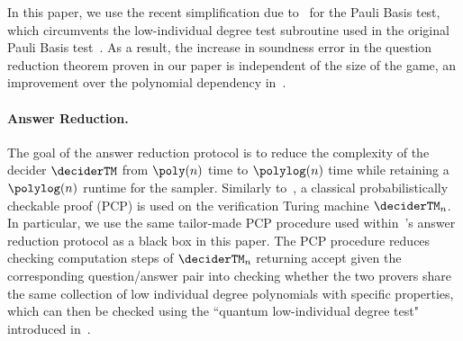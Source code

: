 In this paper, we use the recent simplification due to~\cite{delasalleSpectralGapStability2022} for the Pauli Basis test, which circumvents the low-individual degree test subroutine used in the original Pauli Basis test~\cite[Section 7]{jiMIPRE2022a}. As a result, the increase in soundness error in the question reduction theorem proven in our paper is independent of the size of the game, an improvement over the polynomial dependency in~\cite{jiMIPRE2022a}.  


\paragraph{Answer Reduction. } The goal of the answer reduction protocol is to reduce the complexity of the decider $\deciderTM$ from $\poly(n)$ time to $\polylog(n)$ time while retaining a $\polylog(n)$ runtime for the sampler. Similarly to~\cite{jiMIPRE2022a, natarajanNEEXPMIP2019a}, a classical probabilistically checkable proof (PCP) is used on the verification Turing machine $\deciderTM_n$. In particular, we use the same tailor-made PCP procedure used within~\cite{jiMIPRE2022a}'s answer reduction protocol as a black box in this paper. The PCP procedure reduces checking computation steps of $\deciderTM_n$ returning accept given the corresponding question/answer pair into checking whether the two provers share the same collection of low individual degree polynomials with specific properties, which can then be checked using the ``quantum low-individual degree test" introduced in~\cite{jiQuantumSoundnessTesting2022}.

